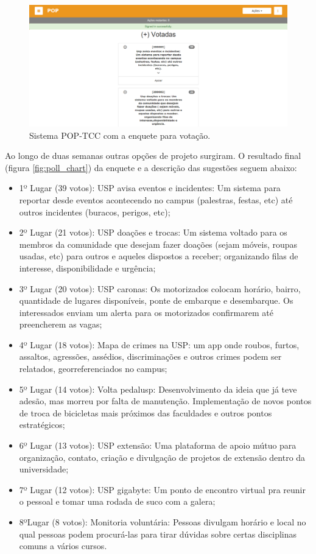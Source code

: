 \begin{figure}[htb]
\includegraphics[width=15cm]{figuras/pop-tcc}
\caption{\label{fig:pop-tcc} Sistema POP-TCC com a enquete para votação.}
\end{figure}
\par Ao longo de duas semanas outras opções de projeto surgiram. O resultado final (figura \ref{fig:poll_chart}) da enquete e a descrição das sugestões seguem abaixo:
\begin{itemize}
\item{ 1º Lugar (39 votos):} USP avisa eventos e incidentes: Um sistema para reportar desde eventos acontecendo no campus (palestras, festas, etc) até outros incidentes (buracos, perigos, etc);
\item {2º Lugar (21 votos):} USP doações e trocas: Um sistema voltado para os membros da comunidade que desejam fazer doações (sejam móveis, roupas usadas, etc) para outros e aqueles dispostos a receber; organizando filas de interesse, disponibilidade e urgência;
\item {3º Lugar (20 votos):} USP caronas: Os motorizados colocam horário, bairro, quantidade de lugares disponíveis, ponte de embarque e desembarque. Os interessados enviam um alerta para os motorizados confirmarem até preencherem as vagas;
\item {4º Lugar (18 votos):} Mapa de crimes na USP: um app onde roubos, furtos, assaltos, agressões, assédios, discriminações e outros crimes podem ser relatados, georreferenciados no campus;
\item {5º Lugar (14 votos):} Volta pedalusp: Desenvolvimento da ideia que já teve adesão, mas morreu por falta de manutenção. Implementação de novos pontos de troca de bicicletas mais próximos das faculdades e outros pontos estratégicos;
\item {6º Lugar (13 votos): } USP extensão: Uma plataforma de apoio mútuo para organização, contato, criação e divulgação de projetos de extensão dentro da universidade;
\item {7º Lugar (12 votos):} USP gigabyte: Um ponto de encontro virtual pra reunir o pessoal e tomar uma rodada de suco com a galera;
\item {8ºLugar (8 votos):} Monitoria voluntária: Pessoas divulgam horário e local no qual pessoas podem procurá-las para tirar dúvidas sobre certas disciplinas comuns a vários cursos.
\end{itemize}
